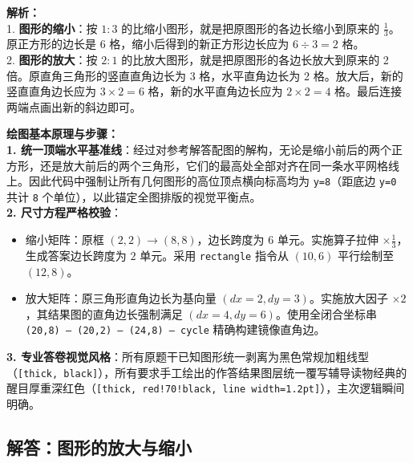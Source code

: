\vspace{0.8cm}

{\small\color{gray}
\textbf{解析：}\\
1. \textbf{图形的缩小}：按 $1:3$ 的比缩小图形，就是把原图形的各边长缩小到原来的 $\frac{1}{3}$。原正方形的边长是 6 格，缩小后得到的新正方形边长应为 $6 \div 3 = 2$ 格。\\
2. \textbf{图形的放大}：按 $2:1$ 的比放大图形，就是把原图形的各边长放大到原来的 2 倍。原直角三角形的竖直直角边长为 3 格，水平直角边长为 2 格。放大后，新的竖直直角边长应为 $3 \times 2 = 6$ 格，新的水平直角边长应为 $2 \times 2 = 4$ 格。最后连接两端点画出新的斜边即可。
}

\vspace{0.6cm}

{\small\color{blue!70!black}
\textbf{绘图基本原理与步骤：}\\
\textbf{1. 统一顶端水平基准线}：经过对参考解答配图的解构，无论是缩小前后的两个正方形，还是放大前后的两个三角形，它们的最高处全部对齐在同一条水平网格线上。因此代码中强制让所有几何图形的高位顶点横向标高均为 \texttt{y=8}（距底边 \texttt{y=0} 共计 \texttt{8} 个单位），以此锚定全图排版的视觉平衡点。\\
\textbf{2. 尺寸方程严格校验}：
   \begin{itemize}
       \item 缩小矩阵：原框 $(2,2) \to (8,8)$，边长跨度为 $6$ 单元。实施算子拉伸 $\times \frac{1}{3}$，生成答案边长跨度为 $2$ 单元。采用 \texttt{rectangle} 指令从 $(10,6)$ 平行绘制至 $(12,8)$。
       \item 放大矩阵：原三角形直角边长为基向量 $(dx=2, dy=3)$。实施放大因子 $\times 2$，其结果图的直角边长强制满足 $(dx=4, dy=6)$。使用全闭合坐标串 \texttt{(20,8) -- (20,2) -- (24,8) -- cycle} 精确构建镜像直角边。
   \end{itemize}
\textbf{3. 专业答卷视觉风格}：所有原题干已知图形统一剥离为黑色常规加粗线型（\texttt{[thick, black]}），所有要求手工绘出的作答结果图层统一覆写辅导读物经典的醒目厚重深红色（\texttt{[thick, red!70!black, line width=1.2pt]}），主次逻辑瞬间明确。
}

\vspace{0.8cm}
\vspace{0.8cm}

\newpage

\subsection{解答：图形的放大与缩小}

\vspace{0.4cm}

